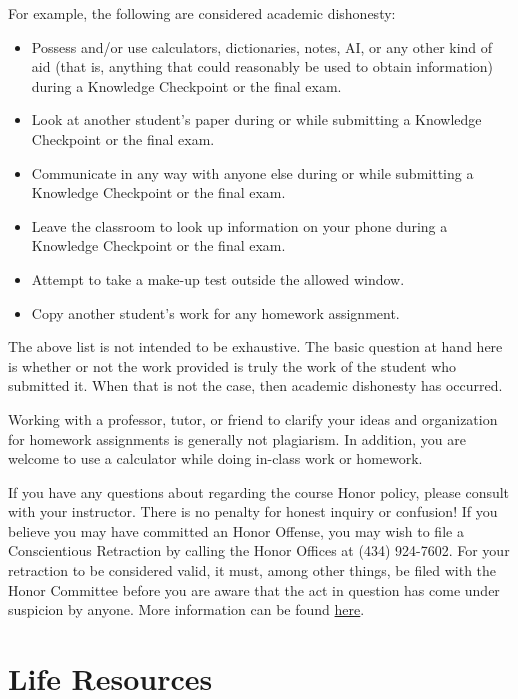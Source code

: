 \documentclass[12pt]{article}
\begin{document}
    For example, the following are considered academic dishonesty:
    \begin{itemize}
        \item Possess and/or use calculators, dictionaries, notes, AI, or any other kind of aid (that is, anything that could reasonably be used to obtain information) during a Knowledge Checkpoint or the final exam.
        \item Look at another student’s paper during or while submitting a Knowledge Checkpoint or the final exam.
        \item Communicate in any way with anyone else during or while submitting a Knowledge Checkpoint or the final exam.
        \item Leave the classroom to look up information on your phone during a Knowledge Checkpoint or the final exam.
        \item Attempt to take a make-up test outside the allowed window.
        \item Copy another student's work for any homework assignment.
    \end{itemize}

    The above list is not intended to be exhaustive. The basic question at hand here is whether or not the work provided is truly the work of the student who submitted it. When that is not the case, then academic dishonesty has occurred.
    
    Working with a professor, tutor, or friend to clarify your ideas and organization for homework assignments is generally not plagiarism. In addition, you are welcome to use a calculator while doing in-class work or homework. 
    
    If you have any questions about regarding the course Honor policy, please consult with your instructor. There is no penalty for honest inquiry or confusion! If you believe you may have committed an Honor Offense, you may wish to file a Conscientious Retraction by calling the Honor Offices at (434) 924-7602. For your retraction to be considered valid, it must, among other things, be filed with the Honor Committee before you are aware that the act in question has come under suspicion by anyone. More information can be found \href{http://www.virginia.edu/honor}{here}. 
	

	
	
	
	\section{Life Resources}
	
\end{document}
